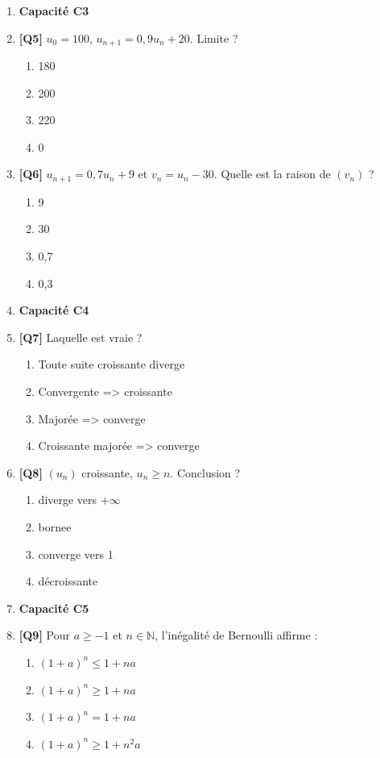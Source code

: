 \begin{enumerate}
\item[] \textbf{Capacité C3}

\item \textbf{[Q5]} $u_0=100$, $u_{n+1}=0{,}9u_n+20$. Limite ?
  \begin{enumerate}[label=\Alph*.]
    \item 180
    \item 200
    \item 220
    \item 0
  \end{enumerate}

\item \textbf{[Q6]} $u_{n+1}=0{,}7u_n+9$ et $v_n=u_n-30$. Quelle est la raison de $(v_n)$ ?
  \begin{enumerate}[label=\Alph*.]
    \item 9
    \item 30
    \item 0,7
    \item 0,3
  \end{enumerate}

\item[] \textbf{Capacité C4}

\item \textbf{[Q7]} Laquelle est vraie ?
  \begin{enumerate}[label=\Alph*.]
    \item Toute suite croissante diverge
    \item Convergente => croissante
    \item Majorée => converge
    \item Croissante majorée => converge
  \end{enumerate}

\item \textbf{[Q8]} $(u_n)$ croissante, $u_n \geq n$. Conclusion ?
  \begin{enumerate}[label=\Alph*.]
    \item diverge vers $+\infty$
    \item bornee
    \item converge vers 1
    \item décroissante
  \end{enumerate}

\item[] \textbf{Capacité C5}

\item \textbf{[Q9]} Pour $a \geqslant -1$ et $n \in \mathbb{N}$, l'inégalité de Bernoulli affirme :
  \begin{enumerate}[label=\Alph*.]
    \item $(1+a)^n \leq 1+na$
    \item $(1+a)^n \geq 1+na$
    \item $(1+a)^n = 1+na$
    \item $(1+a)^n \geqslant 1+n^2a$
  \end{enumerate}


\end{enumerate}
